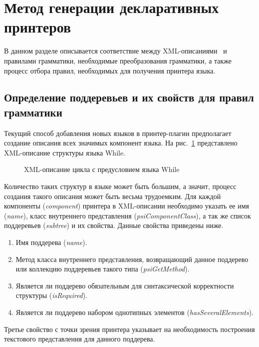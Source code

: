 \section{Метод генерации декларативных принтеров}
\lstset{basicstyle=\normalsize\ttfamily, columns=fullflexible}
В данном разделе описывается соответствие между XML-описаниями~\cite{paper:while} и правилами грамматики, необходимые преобразования грамматики, а также процесс отбора правил, необходимых для получения принтера языка.

\subsection{Определение поддеревьев и их свойств для правил грамматики}
Текущий способ добавления новых языков в принтер-плагин предполагает создание описания всех значимых компонент языка.
На рис.~\ref{mth:whileComponent} представлено XML-описание структуры языка While.
\begin{figure}[b]
    \centering
    
\caption{XML-описание цикла с предусловием языка While}
\label{mth:whileComponent}
\end{figure}
\noindent
Количество таких структур в языке может быть большим, а значит, процесс создания такого описания может быть весьма трудоемким.
Для каждой компоненты (\emph{component}) принтера в XML-описании необходимо указать ее имя (\emph{name}), класс внутреннего представления (\emph{psiComponentClass}), 
    а так же список поддеревьев (\emph{subtree}) и их свойства.
Данные свойства приведены ниже.%
\begin{enumerate}
    \item Имя поддерева (\emph{name}).
    \item Метод класса внутреннего представления, возвращающий данное поддерево или коллекцию поддеревьев такого типа (\emph{psiGetMethod}).%
    \item Является ли поддерево обязательным для синтаксической корректности структуры (\emph{isRequired}).%
    \item Является ли поддерево набором однотипных элементов (\emph{hasSeveralElements}).%
\end{enumerate}
Третье свойство с точки зрения принтера указывает на необходимость построения текстового представления для данного поддерева.
